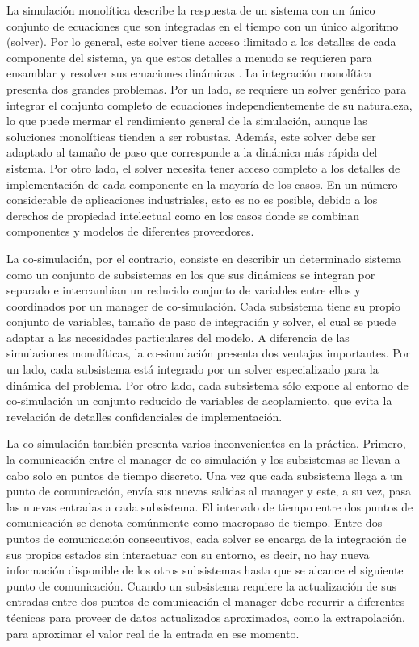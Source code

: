 La simulación monolítica describe la respuesta de un sistema con un único conjunto de ecuaciones que son integradas en el tiempo con un único algoritmo (solver).
Por lo general, este solver tiene acceso ilimitado a los detalles de cada componente del sistema, ya que estos detalles a menudo se requieren para ensamblar y resolver sus ecuaciones dinámicas \cite{Samin2007}. 
La integración monolítica presenta dos grandes problemas. 
Por un lado, se requiere un solver genérico para integrar el conjunto completo de ecuaciones independientemente de su naturaleza, lo que puede mermar el rendimiento general de la simulación, aunque las soluciones monolíticas tienden a ser robustas.
Además, este solver debe ser adaptado al tamaño de paso que corresponde a la dinámica más rápida del sistema.
Por otro lado, el solver necesita tener acceso completo a los detalles de implementación de cada
componente en la mayoría de los casos. 
En un número considerable de aplicaciones industriales, esto es no es posible, debido a los derechos de propiedad intelectual como en los casos donde se combinan componentes y modelos de diferentes proveedores. 

La co-simulación, por el contrario, consiste en describir un determinado sistema como un conjunto de subsistemas en los que sus dinámicas se integran por separado e intercambian un reducido conjunto de variables entre ellos y coordinados por un manager de co-simulación. 
Cada subsistema tiene su propio conjunto de variables, tamaño de paso de integración y solver, el cual se puede adaptar a las necesidades particulares del modelo.
A diferencia de las simulaciones monolíticas, la co-simulación presenta dos ventajas importantes. 
Por un lado, cada subsistema está integrado por un solver especializado para la dinámica del problema.
Por otro lado, cada subsistema sólo expone al entorno de co-simulación un conjunto reducido de variables de acoplamiento, que evita la revelación de detalles confidenciales de implementación. 

La co-simulación también presenta varios inconvenientes en la práctica. 
Primero, la comunicación entre el manager de co-simulación y los subsistemas se llevan a cabo solo en puntos de tiempo discreto.
Una vez que cada subsistema llega a un punto de comunicación, envía sus nuevas salidas al manager y este, a su vez, pasa las nuevas entradas a cada subsistema. 
El intervalo de tiempo entre dos puntos de comunicación se denota comúnmente como macropaso de tiempo. 
Entre dos puntos de comunicación consecutivos, cada solver se encarga de la integración de sus propios estados sin interactuar con su entorno, es decir, no hay nueva información disponible de los otros subsistemas hasta que se alcance el siguiente punto de comunicación. 
Cuando un subsistema requiere la actualización de sus entradas entre dos puntos de comunicación el manager debe recurrir a diferentes técnicas para proveer de datos actualizados aproximados, como la extrapolación, para aproximar
el valor real de la entrada en ese momento. 



